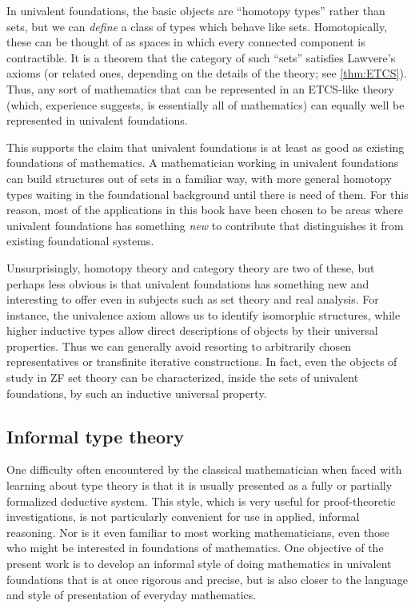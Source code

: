 In univalent foundations, the basic objects are ``homotopy types'' rather than sets, but we can \emph{define} a class of types which behave like sets.
Homotopically, these can be thought of as spaces in which every connected component is contractible.
It is a theorem  that the category of such ``sets'' satisfies Lawvere's axioms (or related ones, depending on the details of the theory; see \autoref{thm:ETCS}).
Thus, any sort of mathematics that can be represented in an ETCS-like theory (which, experience suggests, is essentially all of mathematics) can equally well be represented in univalent foundations.  

This supports the claim that univalent foundations is at least as good as existing foundations of mathematics.
A mathematician working in univalent foundations can build structures out of sets in a familiar way, with more general homotopy types waiting in the foundational background until there is need of them.
For this reason, most of the applications in this book have been chosen to be areas where univalent foundations has something \emph{new} to contribute that distinguishes it from existing foundational systems.

Unsurprisingly, homotopy theory and category theory are two of these, but perhaps less obvious is that univalent foundations has something new and interesting to offer even in subjects such as set theory and real analysis.
For instance, the univalence axiom allows us to identify isomorphic structures, while higher inductive types allow direct descriptions of objects by their universal properties.
Thus we can generally avoid resorting to arbitrarily chosen representatives or transfinite iterative constructions.
In fact, even the objects of study in ZF set theory can be characterized, inside the sets of univalent foundations, by such an inductive universal property.


\subsection*{Informal type theory}

One difficulty often encountered by the classical mathematician when faced with learning about type theory is that it is usually presented as a fully or partially formalized deductive system.
This style, which is very useful for proof-theoretic investigations, is not particularly convenient for use in applied, informal reasoning.
Nor is it even familiar to most working mathematicians, even those who might be interested in foundations of mathematics.
One objective of the present work is to develop an informal style of doing mathematics in univalent foundations that is at once rigorous and precise, but is also closer to the language and style of presentation of everyday mathematics.

